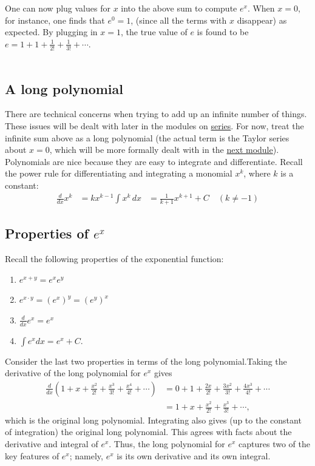 \documentclass[twoside,openright,titlepage,a4paper]{book}
\begin{document}
\begin{sloppypar}
One can now plug values for $x$ into the above sum to compute ${e^x}$. When ${x=0}$, for instance, one finds that ${e^0=1}$, (since all the terms with $x$ disappear) as expected. By plugging in ${x=1}$, the true value of $e$ is found to be ${e=1+1+\frac{1}{2!}+\frac{1}{3!}+\dotsb}$.\\\\

\subsection{A long polynomial}

There are technical concerns when trying to add up an infinite number of things. These issues will be dealt with later in the modules on \hyperref[ChDiscretizationSecSeries]{series}. For now, treat the infinite sum above as a long polynomial (the actual term is the Taylor series about ${x=0}$, which will be more formally dealt with in the \hyperref[ChFunctionsSecTaylorSeries]{next module}). Polynomials are nice because they are easy to integrate and differentiate. Recall the power rule for differentiating and integrating a monomial ${x^k}$, where $k$ is a constant:
\begin{align*}
\frac{d}{dx} x^k &= kx^{k-1} 
\int x^k \, dx &= \frac{1}{k+1} x^{k+1} + C \quad (k \neq -1) 
\end{align*}

\subsection{Properties of $e^x$}

Recall the following properties of the exponential function:
\begin{enumerate}
\item ${e^{x+y} = e^xe^y}$
\item ${e^{x\cdot y}=(e^x)^y=(e^y)^x}$
\item ${\frac{d}{dx}e^x = e^x}$
\item ${\int e^x dx=e^x+C}$.
\end{enumerate}

Consider the last two properties in terms of the long polynomial.Taking the derivative of the long polynomial for ${e^x}$ gives
\begin{align*} 
\frac{d}{dx}(1+x+\frac{x^2}{2!}+\frac{x^3}{3!} + \frac{x^4}{4!} + \dotsb)
&= 0 + 1 + \frac{2x}{2!} + \frac{3x^2}{3!} + \frac{4 x^3}{4!} + \dotsb\\
&= 1 + x + \frac{x^2}{2!} + \frac{x^3}{3!} + \dotsb,
\end{align*}
which is the original long polynomial. Integrating also gives (up to the constant of integration) the original long polynomial. This agrees with facts about the derivative and integral of ${e^x}$. Thus, the long polynomial for ${e^x}$ captures two of the key features of ${e^x}$; namely, ${e^x}$ is its own derivative and its own integral.


\end{sloppypar}
\end{document}
